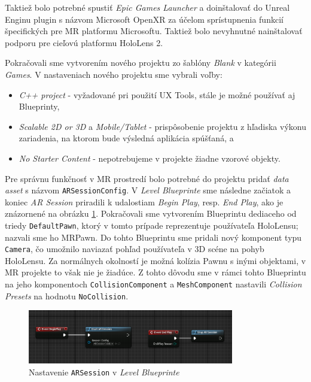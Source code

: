 Taktiež bolo potrebné spustiť \emph{Epic Games Launcher} a doinštalovať do Unreal Enginu plugin s názvom Microsoft OpenXR za účelom sprístupnenia funkcií špecifických pre MR platformu Microsoftu. Taktiež bolo nevyhnutné
nainštalovať podporu pre cieľovú platformu HoloLens 2. 

Pokračovali sme vytvorením nového projektu zo šablóny \emph{Blank} v kategórii \emph{Games}. V nastaveniach nového projektu sme vybrali voľby:
\begin{itemize}
  \item \emph{C++ project} - vyžadované pri použití UX Tools, stále je možné používať aj Blueprinty,
  \item \emph{Scalable 2D or 3D} a \emph{Mobile/Tablet} - prispôsobenie projektu z hľadiska výkonu zariadenia, na ktorom bude výsledná aplikácia spúšťaná, a
  \item \emph{No Starter Content} - nepotrebujeme v projekte žiadne vzorové objekty.
\end{itemize}

Pre správnu funkčnosť v MR prostredí bolo potrebné do projektu pridať \emph{data asset} s názvom \texttt{ARSessionConfig}. V \emph{Level Blueprinte} sme následne začiatok a koniec \emph{AR Session}
priradili k udalostiam \emph{Begin Play}, resp. \emph{End Play}, ako je znázornené na obrázku \ref{arsession}.
Pokračovali sme vytvorením Blueprintu dediaceho od triedy \texttt{DefaultPawn}, ktorý v tomto prípade reprezentuje používateľa HoloLensu; nazvali sme ho MRPawn.
Do tohto Blueprintu sme pridali nový komponent typu
\texttt{Camera}, čo umožnilo naviazať pohľad používateľa v 3D scéne na pohyb HoloLensu. Za normálnych okolností je možná kolízia Pawnu s inými objektami, v MR projekte to však nie je žiadúce.
Z tohto dôvodu sme v rámci tohto Blueprintu na jeho komponentoch \texttt{CollisionComponent} a \texttt{MeshComponent} nastavili \emph{Collision Presets} na hodnotu \texttt{NoCollision}. 

\begin{figure}[!htbp]
  \centering
  \includegraphics[width=9cm]{img/arsession.png}
  \caption{Nastavenie \texttt{ARSession} v \emph{Level Blueprinte}}
  \label{arsession}
\end{figure}

